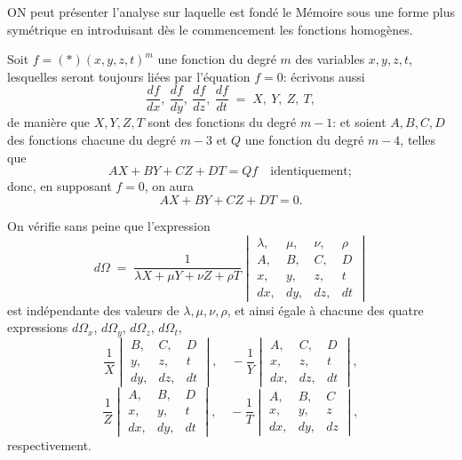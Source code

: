 \documentclass[11pt]{article}
\begin{document}
\medskip

\noindent ON peut pr\'esenter l'analyse sur laquelle est fond\'e le M\'emoire sous une forme plus sym\'etrique en introduisant d\`es le commencement les fonctions homog\`enes.

Soit $f = (\ast)(x, y, z, t)^m$ une fonction du degr\'e $m$ des variables $x, y, z, t$, lesquelles seront toujours li\'ees par l'\'equation $f=0$: \'ecrivons aussi
\[
\frac{df}{dx},\ \frac{df}{dy},\ \frac{df}{dz},\ \frac{df}{dt} \;=\; X,\ Y,\ Z,\ T,
\]
de mani\`ere que $X, Y, Z, T$ sont des fonctions du degr\'e $m-1$: et soient $A, B, C, D$ des fonctions chacune du degr\'e $m-3$ et $Q$ une fonction du degr\'e $m-4$, telles que
\[
AX + BY + CZ + DT = Qf \quad\text{identiquement};
\]
donc, en supposant $f=0$, on aura
\[
AX + BY + CZ + DT = 0.
\]

On v\'erifie sans peine que l'expression
\[
d\Omega \;=\; \frac{1}{\lambda X+\mu Y+\nu Z+\rho T}
\begin{vmatrix}
\lambda, & \mu, & \nu, & \rho\\
A, & B, & C, & D\\
x, & y, & z, & t\\
dx, & dy, & dz, & dt
\end{vmatrix}
\]
est ind\'ependante des valeurs de $\lambda, \mu, \nu, \rho$, et ainsi \'egale \`a chacune des quatre expressions $d\Omega_x$, $d\Omega_y$, $d\Omega_z$, $d\Omega_t$,
\[
\frac{1}{X}\begin{vmatrix} B, & C, & D\\ y, & z, & t\\ dy, & dz, & dt \end{vmatrix},\quad
-\frac{1}{Y}\begin{vmatrix} A, & C, & D\\ x, & z, & t\\ dx, & dz, & dt \end{vmatrix},
\]
\[
\frac{1}{Z}\begin{vmatrix} A, & B, & D\\ x, & y, & t\\ dx, & dy, & dt \end{vmatrix},\quad
-\frac{1}{T}\begin{vmatrix} A, & B, & C\\ x, & y, & z\\ dx, & dy, & dz \end{vmatrix},
\]
respectivement.
\end{document}
